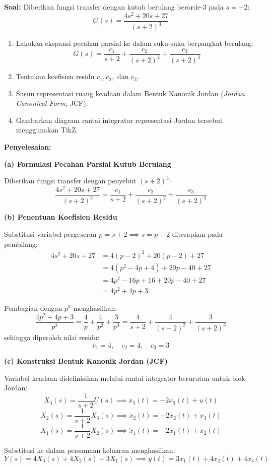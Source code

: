 \documentclass[11pt,a4paper]{article}
\begin{document}
\textbf{Soal:}  
Diberikan fungsi transfer dengan kutub berulang berorde-3 pada $s = -2$:
$$G(s) = \frac{4s^2 + 20s + 27}{(s+2)^3}$$
\begin{enumerate}[label=(\alph*)]
    \item Lakukan ekspansi pecahan parsial ke dalam suku-suku berpangkat berulang:
    $$G(s) = \frac{c_1}{s+2} + \frac{c_2}{(s+2)^2} + \frac{c_3}{(s+2)^3}$$
    \item Tentukan koefisien residu $c_1, c_2,$ dan $c_3$.
    \item Susun representasi ruang keadaan dalam Bentuk Kanonik Jordan (\textit{Jordan Canonical Form}, JCF).
    \item Gambarkan diagram rantai integrator representasi Jordan tersebut menggunakan TikZ.
\end{enumerate}

\textbf{Penyelesaian:}

\textbf{(a) Formulasi Pecahan Parsial Kutub Berulang}

Diberikan fungsi transfer dengan penyebut $(s+2)^3$:
$$\frac{4s^2 + 20s + 27}{(s+2)^3} = \frac{c_1}{s+2} + \frac{c_2}{(s+2)^2} + \frac{c_3}{(s+2)^3}$$

\textbf{(b) Penentuan Koefisien Residu}

Substitusi variabel pergeseran $p = s + 2 \implies s = p - 2$ diterapkan pada pembilang:
\begin{align*}
    4s^2 + 20s + 27 &= 4(p-2)^2 + 20(p-2) + 27 \\
    &= 4(p^2 - 4p + 4) + 20p - 40 + 27 \\
    &= 4p^2 - 16p + 16 + 20p - 40 + 27 \\
    &= 4p^2 + 4p + 3
\end{align*}

Pembagian dengan $p^3$ menghasilkan:
$$\frac{4p^2 + 4p + 3}{p^3} = \frac{4}{p} + \frac{4}{p^2} + \frac{3}{p^3} = \frac{4}{s+2} + \frac{4}{(s+2)^2} + \frac{3}{(s+2)^3}$$
sehingga diperoleh nilai residu:
$$c_1 = 4, \quad c_2 = 4, \quad c_3 = 3$$

\textbf{(c) Konstruksi Bentuk Kanonik Jordan (JCF)}

Variabel keadaan didefinisikan melalui rantai integrator berurutan untuk blok Jordan:
$$X_3(s) = \frac{1}{s+2} U(s) \implies \dot{x}_3(t) = -2x_3(t) + u(t)$$
$$X_2(s) = \frac{1}{s+2} X_3(s) \implies \dot{x}_2(t) = -2x_2(t) + x_3(t)$$
$$X_1(s) = \frac{1}{s+2} X_2(s) \implies \dot{x}_1(t) = -2x_1(t) + x_2(t)$$

Substitusi ke dalam persamaan keluaran menghasilkan:
$$Y(s) = 4X_3(s) + 4X_2(s) + 3X_1(s) \implies y(t) = 3x_1(t) + 4x_2(t) + 4x_3(t)$$
\end{document}
